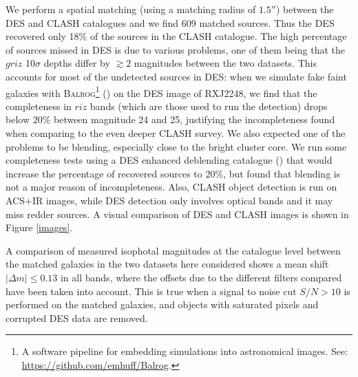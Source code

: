{We perform a spatial matching (using a matching radius of $1.5''$) between the DES and CLASH catalogues and we find 609 matched sources. Thus the DES recovered only 18\% of the sources in the CLASH catalogue. The high percentage of sources missed in DES is due to various problems, one of them being that the $griz$ 10$\sigma$ depths differ by $\gtrsim2$ magnitudes between the two datasets. This accounts for most of the undetected sources in DES: when we simulate fake faint galaxies with \textsc{Balrog}\footnote{A software pipeline for embedding simulations into astronomical images. See: \url{https://github.com/emhuff/Balrog}.} (\citealt{suchyta}) on the DES image of RXJ2248, we find that the completeness in $riz$ bands (which are those used to run the detection) drops below 20\% between magnitude 24 and 25, justifying the incompleteness found when comparing to the even deeper CLASH survey. We also expected one of the problems to be blending, especially close to the bright cluster core. We run some completeness tests using a DES enhanced deblending catalogue (\citealt{yuanyuan}) that would increase the percentage of recovered sources to 20\%, but found that blending is not a major reason of incompleteness. Also, CLASH object detection is run on ACS+IR images, while DES detection only involves optical bands and it may miss redder sources. A visual comparison of DES and CLASH images is shown in Figure \ref{images}.

A comparison of measured isophotal magnitudes at the catalogue level between the matched galaxies in the two datasets here considered shows a mean shift $|\Delta m| \leq 0.13$ in all bands, where the offsets due to the different filters compared have been taken into account. This is true when a signal to noise cut $S/N>10$ is performed on the matched galaxies, and objects with saturated pixels and corrupted DES data are removed.

}
